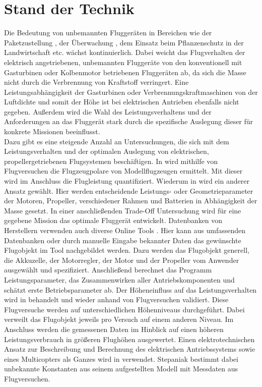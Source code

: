 \section{Stand der Technik}
\label{sec:stand_der_technik}
Die Bedeutung von unbemannten Fluggeräten in Bereichen wie der Paketzustellung \cite{amazon}, der Überwachung \cite{polizei}, dem Einsatz beim Pflanzenschutz in der Landwirtschaft \cite{landwirtschaft} etc. wächst kontinuierlich. Dabei weicht das Flugverhalten der elektrisch angetriebenen, unbemannten Fluggeräte von den konventionell mit Gasturbinen oder Kolbenmotor betriebenen Fluggeräten ab, da sich die Masse nicht durch die Verbrennung von Kraftstoff verringert. Eine Leistungsabhängigkeit der Gasturbinen oder Verbrennungskraftmaschinen von der Luftdichte und somit der Höhe ist bei elektrischen Antrieben ebenfalls nicht gegeben. Außerdem wird die Wahl des Leistungsverhaltens und der Anforderungen an das Fluggerät stark durch die spezifische Auslegung dieser für konkrete Missionen beeinflusst. \\
Dazu gibt es eine steigende Anzahl an Untersuchungen, die sich mit dem Leistungsverhalten und der optimalen Auslegung von elektrischen, propellergetriebenen Flugsystemen beschäftigen. In \cite{Ostler.2006} wird mithilfe von Flugversuchen die Flugzeugpolare von Modellflugzeugen ermittelt. Mit dieser wird im Anschluss die Flugleistung quantifiziert. Wiederum in \cite{KARI.2017} wird ein anderer Ansatz gewählt. Hier werden entscheidende Leistungs- oder Geometrieparameter der Motoren, Propeller, verschiedener Rahmen und Batterien in Abhängigkeit der Masse gesetzt. In einer anschließenden Trade-Off Untersuchung wird für eine gegebene Mission das optimale Fluggerät entwickelt. Datenbanken von Herstellern verwenden auch diverse Online Tools \cite{Drivecalc,eCalc,Flyeval}. Hier kann aus umfassenden Datenbanken oder durch manuelle Eingabe bekannter Daten das gewünschte Flugobjekt im Tool nachgebildet werden. Dazu werden das Flugobjekt generell, die Akkuzelle, der Motorregler, der Motor und der Propeller vom Anwender ausgewählt und spezifiziert. Anschließend berechnet das Programm Leistungsparameter, das Zusammenwirken aller Antriebskomponenten und schätzt erste Betriebsparameter ab. Der Höheneinfluss auf das Leistungsverhalten wird in \cite{PCUP.2017} behandelt und wieder anhand von Flugversuchen validiert. Diese Flugversuche werden auf unterschiedlichen Höhenniveaus durchgeführt. Dabei verweilt das Flugobjekt jeweils pro Versuch auf einem anderen Niveau. Im Anschluss werden die gemessenen Daten im Hinblick auf einen höheren Leistungsverbrauch in größeren Flughöhen ausgewertet. Einen elektrotechnischen Ansatz zur Beschreibung und Berechnung des elektrischen Antriebssystems sowie eines Multicopters als Ganzes wird in \cite{Quan.2017,Shi.2017,Stepaniak.2009} verwendet. Stepaniak bestimmt dabei unbekannte Konstanten aus seinem aufgestellten Modell mit Messdaten aus Flugversuchen. \\
